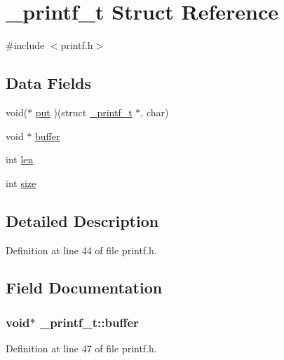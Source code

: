 \hypertarget{struct__printf__t}{\section{\-\_\-printf\-\_\-t Struct Reference}
\label{struct__printf__t}
}


{\ttfamily \#include $<$printf.\-h$>$}

\subsection*{Data Fields}
\begin{DoxyCompactItemize}
\item 
void($\ast$ \hyperlink{struct__printf__t_a3302c3396c6ff238e760c625ab51725b}{put} )(struct \hyperlink{struct__printf__t}{\-\_\-printf\-\_\-t} $\ast$, char)
\item 
void $\ast$ \hyperlink{struct__printf__t_ad35884151d0be6667caafad8caacc76f}{buffer}
\item 
int \hyperlink{struct__printf__t_a5139902cde74159b79e6418a34712bee}{len}
\item 
int \hyperlink{struct__printf__t_a38c7a430cec9b063bf6df7a100d3abaa}{size}
\end{DoxyCompactItemize}


\subsection{Detailed Description}


Definition at line 44 of file printf.\-h.



\subsection{Field Documentation}
\hypertarget{struct__printf__t_ad35884151d0be6667caafad8caacc76f}{
\subsubsection[{buffer}]{\setlength{\rightskip}{0pt plus 5cm}void$\ast$ \-\_\-printf\-\_\-t\-::buffer}}\label{struct__printf__t_ad35884151d0be6667caafad8caacc76f}


Definition at line 47 of file printf.\-h.



